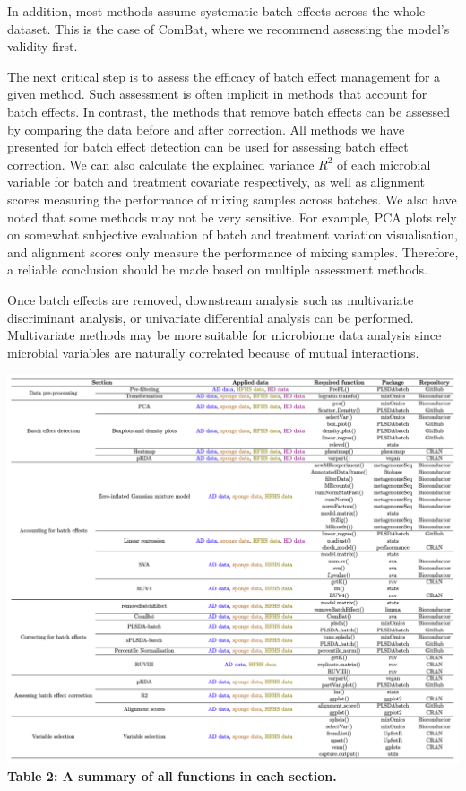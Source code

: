 \documentclass[
]{book}
\begin{document}
In addition, most methods assume systematic batch effects across the whole dataset. This is the case of ComBat, where we recommend assessing the model's validity first.

The next critical step is to assess the efficacy of batch effect management for a given method. Such assessment is often implicit in methods that account for batch effects. In contrast, the methods that remove batch effects can be assessed by comparing the data before and after correction. All methods we have presented for batch effect detection can be used for assessing batch effect correction. We can also calculate the explained variance \(R^2\) of each microbial variable for batch and treatment covariate respectively, as well as alignment scores measuring the performance of mixing samples across batches. We also have noted that some methods may not be very sensitive. For example, PCA plots rely on somewhat subjective evaluation of batch and treatment variation visualisation, and alignment scores only measure the performance of mixing samples. Therefore, a reliable conclusion should be made based on multiple assessment methods.

Once batch effects are removed, downstream analysis such as multivariate discriminant analysis, or univariate differential analysis can be performed. Multivariate methods may be more suitable for microbiome data analysis since microbial variables are naturally correlated because of mutual interactions.

\includegraphics{./figures/function_description.png}
\textbf{Table 2: A summary of all functions in each section.}
\end{document}
